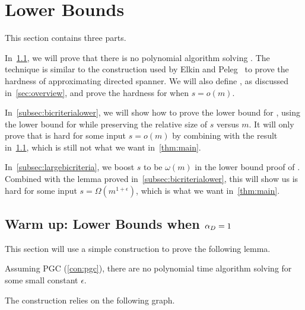 	\section{Lower Bounds}\label{sec:lowerbounds}

This section contains three parts.

In~\cref{subsec:warmup}, we will prove that there is no polynomial algorithm solving . The technique is similar to the construction used by Elkin and Peleg~\cite{ElkinP07} to prove the hardness of approximating directed spanner. We will also define \ga{}, as discussed in~\cref{sec:overview}, and prove the hardness for \ga{} when $s=o(m)$.

In~\cref{subsec:bicriterialower}, we will show how to prove the lower bound for , using the lower bound for \ga{} while preserving the relative size of $s$ versus $m$. It will only prove that  is hard for some input $s=o(m)$ by combining with the result in~\cref{subsec:warmup}, which is still not what we want in~\cref{thm:main}.

In~\cref{subsec:largebicriteria}, we boost $s$ to be $\omega(m)$ in the lower bound proof of \ga{}. Combined with the lemma proved in~\cref{subsec:bicriterialower}, this will show us  is hard for some input $s=\Omega(m^{1+\epsilon})$, which is what we want in~\cref{thm:main}.


\subsection{Warm up: Lower Bounds when \texorpdfstring{$\alpha_D=1$}{apxD1}}\label{subsec:warmup}

This section will use a simple construction to prove the following lemma.

\begin{lemma}\label{lem:onecriteria}
	Assuming PGC (\cref{con:pgc}), there are no polynomial time algorithm solving  for some small constant $\epsilon$. 
	
\end{lemma}

The construction relies on the following \minre{} graph.

